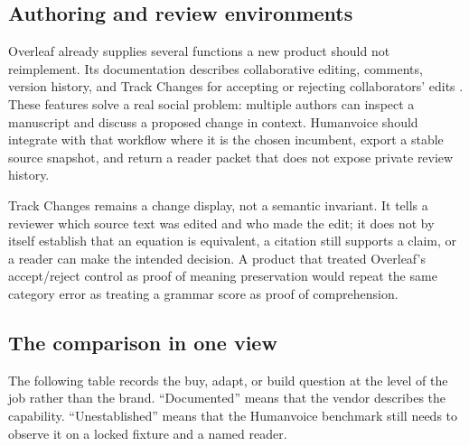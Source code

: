 \subsection{Authoring and review environments}

Overleaf already supplies several functions a new product should not
reimplement. Its documentation describes collaborative editing, comments,
version history, and Track Changes for accepting or rejecting collaborators'
edits \citep{overleaf2026trackchanges}. These features solve a real social
problem: multiple authors can inspect a manuscript and discuss a proposed
change in context. Humanvoice should integrate with that workflow where it is
the chosen incumbent, export a stable source snapshot, and return a reader
packet that does not expose private review history.

Track Changes remains a change display, not a semantic invariant. It tells a
reviewer which source text was edited and who made the edit; it does not by
itself establish that an equation is equivalent, a citation still supports a
claim, or a reader can make the intended decision. A product that treated
Overleaf's accept/reject control as proof of meaning preservation would repeat
the same category error as treating a grammar score as proof of comprehension.

\subsection{The comparison in one view}

The following table records the buy, adapt, or build question at the level of
the job rather than the brand. ``Documented'' means that the vendor describes
the capability. ``Unestablished'' means that the Humanvoice benchmark still
needs to observe it on a locked fixture and a named reader.

